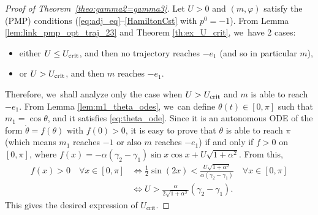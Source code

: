 \documentclass[JEP,XML,SOM,Unicode,NoEqCountersInSection,NoFloatCountersInSection,published]{cedram}
\theoremstyle{definition}
\begin{document}
\begin{proof}[Proof of Theorem~\ref{theo:gamma2=gamma3}]
Let $U > 0$ and $(m, \varphi)$ satisfy the (PMP) conditions (\eqref{eq:adj_eq}--\eqref{HamiltonCst} with $p^0 = -1$). From Lemma \ref{lem:link_pmp_opt_traj_23} and Theorem \ref{th:ex_U_crit}, we~have 2 cases:
\begin{itemize}
\item either $U \leq U_\textnormal{crit}$, and then no trajectory reaches $- e_1$ (and so in particular $m$),
\item or $U > U_\textnormal{crit}$, and then $m$ reaches $- e_1$.
\end{itemize}

Therefore, we~shall analyze only the case when $U > U_{\rm crit}$ and $m$ is able to reach~$- e_1$. From Lemma \ref{lem:m1_theta_odes}, we~can define $\theta (t) \in [0, \pi]$ such that $m_1 = \cos \theta$, and it satisfies \eqref{eq:theta_ode}. Since it is an autonomous ODE of the form $\dot \theta = f(\theta)$ with $f(0) > 0$, it is easy to prove that $\theta$ is able to reach $\pi$ (which means $m_1$ reaches $-1$ or also $m$ reaches $- e_1$) if and only if $f > 0$ on $[0, \pi]$, where $f (x) = - \alpha (\gamma_2 - \gamma_1) \sin{x} \cos{x} + U \sqrt{1 + \alpha^2}$.
From this,
\begin{align*}
f (x) > 0 \quad \forall x \in [0, \pi] &\iff \frac{1}{2} \sin{(2x)} < \frac{U \sqrt{1 + \alpha^2}}{\alpha (\gamma_2 - \gamma_1)} \quad \forall x \in [0, \pi] \\
&\iff U > \frac{\alpha}{2 \sqrt{1 + \alpha^2}} (\gamma_2 - \gamma_1).
\end{align*}
This gives the desired expression of $U_{\textrm{crit}}$.


\end{proof}
\end{document}
